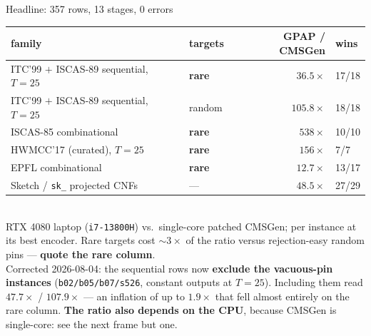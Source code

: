 \documentclass[aspectratio=169,11pt]{beamer}
\newcommand{\good}[1]{\textcolor{gpapgreen}{#1}}
\newcommand{\bad}[1]{\textcolor{gpapred}{#1}}
\newcommand{\rem}[1]{{\footnotesize\textcolor{gpapgray}{#1}}}
\newcommand{\keyw}[1]{\textcolor{gpapblue}{\textbf{#1}}}
\begin{document}
\begin{frame}{Headline: 357 rows, 13 stages, 0 errors}
  \centering
  \small
  \begin{tabular}{@{}llrl@{}}
    \toprule
    family & targets & GPAP / CMSGen & wins \\
    \midrule
    ITC'99 $+$ ISCAS-89 sequential, $T{=}25$ & \keyw{rare} & \good{$36.5\times$} & 17/18 \\
    ITC'99 $+$ ISCAS-89 sequential, $T{=}25$ & random & $105.8\times$ & 18/18 \\
    ISCAS-85 combinational & \keyw{rare} & $538\times$ & 10/10 \\
    HWMCC'17 (curated), $T{=}25$ & \keyw{rare} & $156\times$ & 7/7 \\
    EPFL combinational & \keyw{rare} & $12.7\times$ & 13/17 \\
    Sketch / \texttt{sk\_} projected CNFs & --- & $48.5\times$ & 27/29 \\
    \bottomrule
  \end{tabular}
  \\[1.0em]
  \rem{RTX 4080 laptop (\texttt{i7-13800H}) vs.\ single-core patched CMSGen; per instance at its
  best encoder. Rare targets cost ${\sim}3\times$ of the ratio versus rejection-easy random pins
  --- \keyw{quote the rare column}.
  \\ \bad{Corrected 2026-08-04}: the sequential rows now \keyw{exclude the vacuous-pin instances}
  (\texttt{b02/b05/b07/s526}, constant outputs at $T{=}25$). Including them read $47.7\times$ /
  $107.9\times$ --- an inflation of up to $1.9\times$ that fell almost entirely on the rare
  column. \keyw{The ratio also depends on the CPU}, because CMSGen is single-core: see the next
  frame but one.}
\end{frame}
\end{document}

